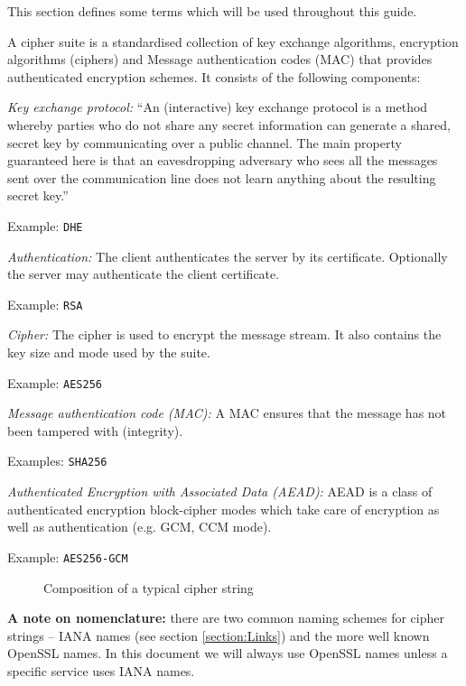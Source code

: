 
This section defines some terms which will be used throughout this guide.


A cipher suite is a standardised collection of key exchange algorithms, encryption 
algorithms (ciphers) and Message authentication codes (MAC) that provides authenticated 
encryption schemes. It consists of the following components:

\begin{description}

\item{\it Key exchange protocol:}
``An (interactive) key exchange protocol is a method whereby parties who do not 
share any secret information can generate a shared, secret key by communicating 
over a public channel. The main property guaranteed here is that an 
eavesdropping adversary who sees all the messages sent over the communication 
line does not learn anything about the resulting secret key.'' \cite{katz2008introduction}

Example: \texttt{DHE}

\item{\it Authentication:}
The client authenticates the server by its certificate. Optionally the server 
may authenticate the client certificate.

Example: \texttt{RSA}

\item{\it Cipher:}
The cipher is used to encrypt the message stream. It also contains the key size
and mode used by the suite.

Example: \texttt{AES256}

\item{\it Message authentication code (MAC):}
A MAC ensures that the message has not been tampered with (integrity).

Examples: \texttt{SHA256}

\item{\it Authenticated Encryption with Associated Data (AEAD):}
AEAD is a class of authenticated encryption block-cipher modes
which take care of encryption as well as authentication (e.g. GCM, CCM mode). 

Example: \texttt{AES256-GCM}



\begin{figure}[h]
\caption{Composition of a typical cipher string}
\end{figure}

\item {\textbf{A note on nomenclature:}} there are two common naming schemes for cipher strings -- IANA names (see section \ref{section:Links}) and the more well known OpenSSL names. In this document we will always use OpenSSL names unless a specific service uses IANA names.

\end{description}
